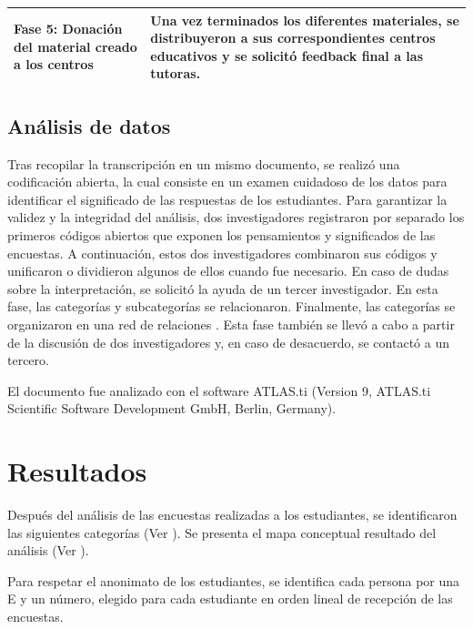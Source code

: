 \documentclass[spanish]{textolivre}
\begin{document}
\begin{table}[h!]
\begin{threeparttable}
\begin{tabular}{p{}p{}}
    Fase 5: Donación del material creado a los centros &
    Una vez terminados los diferentes materiales, se distribuyeron a sus correspondientes centros educativos y se solicitó feedback final a las tutoras. \\
    \bottomrule
    \end{tabular}
\end{threeparttable}
\end{table}


\subsection{Análisis de datos}

Tras recopilar la transcripción en un mismo documento, se realizó una codificación abierta, la cual consiste en un examen cuidadoso de los datos para identificar el significado de las respuestas de los estudiantes. Para garantizar la validez y la integridad del análisis, dos investigadores registraron por separado los primeros códigos abiertos que exponen los pensamientos y significados de las encuestas. A continuación, estos dos investigadores combinaron sus códigos y unificaron o dividieron algunos de ellos cuando fue necesario. En caso de dudas sobre la interpretación, se solicitó la ayuda de un tercer investigador. En esta fase, las categorías y subcategorías se relacionaron. Finalmente, las categorías se organizaron en una red de relaciones \cite{de_la_espriella_teorifundamentada_2020}. Esta fase también se llevó a cabo a partir de la discusión de dos investigadores y, en caso de desacuerdo, se contactó a un tercero.

El documento fue analizado con el software ATLAS.ti (Version 9, ATLAS.ti Scientific Software Development GmbH, Berlin, Germany).

\section{Resultados}

Después del análisis de las encuestas realizadas a los estudiantes, se identificaron las siguientes categorías (Ver ). Se presenta el mapa conceptual resultado del análisis (Ver ).

Para respetar el anonimato de los estudiantes, se identifica cada persona por una E y un número, elegido para cada estudiante en orden lineal de recepción de las encuestas.
\end{document}
